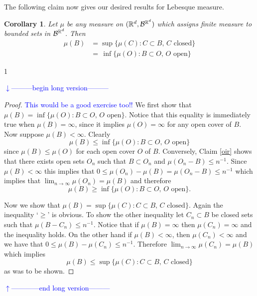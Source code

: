 \documentclass[10pt,letterpaper,twocolumn]{article}
\newtheorem{corollary}{Corollary}
\def\Ver{1}
\def\LongVer{1}
\begin{document}
The following claim now gives our desired results for Lebesque measure.
\begin{corollary}
\label{ir}
Let $\mu$ be any measure on $(\Bbb R^d,\mathcal B^{\Bbb R^d})$ which assigns finite measure to bounded sets in $\mathcal B^{\Bbb R^d}$. Then
\begin{align*}
\mathcal \mu(B)  &= \sup \{ \mathcal \mu(C):  C\subset B,\, \text{$C$ closed}\}\\
  &=\, \inf \{ \mu(O):  B\subset O,\, \text{$O$ open}\}
\end{align*}
\end{corollary}


\if\Ver\LongVer{ 
{\flushleft\textcolor{blue}{$\downarrow$---------begin long version---------}}\newline



\begin{proof}\textcolor{blue}{This would be a good exercise too!!}
We first show that $\mathcal \mu(B) = \inf \{ \mu(O):  B\subset O,\, \text{$O$ open}\}
$. Notice that this equality is immediately true when $\mu(B)=\infty$, since it implies $\mu(O)=\infty$ for any open cover of $B$.  Now suppose $\mu(B)<\infty$. 
Clearly 
\[\mathcal \mu(B) \leq \inf \{ \mu(O):  B\subset O,\, \text{$O$ open}\}\]
 since $\mu(B)\leq \mu(O)$ for each open cover $O$ of $B$. Conversely, Claim \ref{oir} shows that there exists open sets $O_n$ such that $B\subset O_n$ and $\mu(O_n-B) \leq n^{-1}$. Since $\mu(B)<\infty$ this implies that $0\leq \mu(O_n)-\mu(B)=\mu(O_n-B) \leq n^{-1}$ which implies that $\lim_{n\rightarrow \infty}\mu(O_n)= \mu(B)$ and therefore
 \[\mathcal \mu(B) \geq \inf \{ \mu(O):  B\subset O,\, \text{$O$ open}\}.\]

Now we show that $\mathcal \mu(B) = \sup \{ \mu(C): C\subset B,\, \text{$C$ closed}\}$. Again the inequality `$\geq$' is obvious. To show the other inequality let $C_n\subset B$ be closed sets such that $\mu(B-C_n)\leq n^{-1}$. Notice that if $\mu(B)=\infty$ then $\mu(C_n)=\infty$ and the inequality holds. On the other hand if $\mu(B)<\infty$, then $\mu(C_n)<\infty$ and we have that  $0\leq \mu(B)-\mu(C_n)\leq n^{-1}$. Therefore $\lim_{n\rightarrow \infty} \mu(C_n)=\mu(B)$ which implies
\[\mathcal \mu(B) \leq \sup \{ \mu(C): C\subset B,\, \text{$C$ closed}\}\]
as was to be shown.
 \end{proof}

%
{\flushleft\textcolor{blue}{$\uparrow$------------end long version---------}}\newline
} \fi
\end{document}
